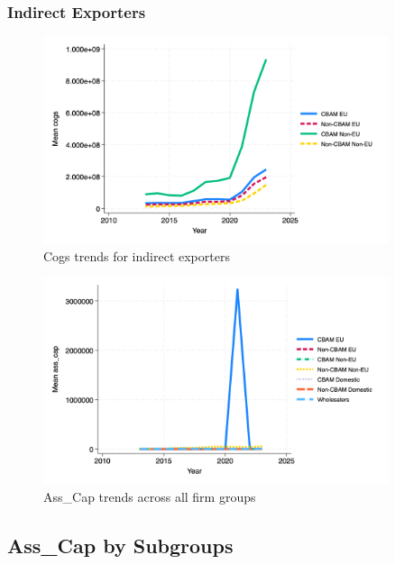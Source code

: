 \documentclass{article}
\begin{document}
\subsubsection{Indirect Exporters}
\begin{figure}[h!]
\centering
\includegraphics[width=0.9\textwidth]{cogs_indir.png}
\caption{Cogs trends for indirect exporters}
\label{fig:cogs_indir}
\end{figure}

\begin{figure}[h!]
\centering
\includegraphics[width=0.9\textwidth]{ass_cap_main_groups.png}
\caption{Ass_Cap trends across all firm groups}
\label{fig:ass_cap_main}
\end{figure}

\subsection{Ass_Cap by Subgroups}
\end{document}
